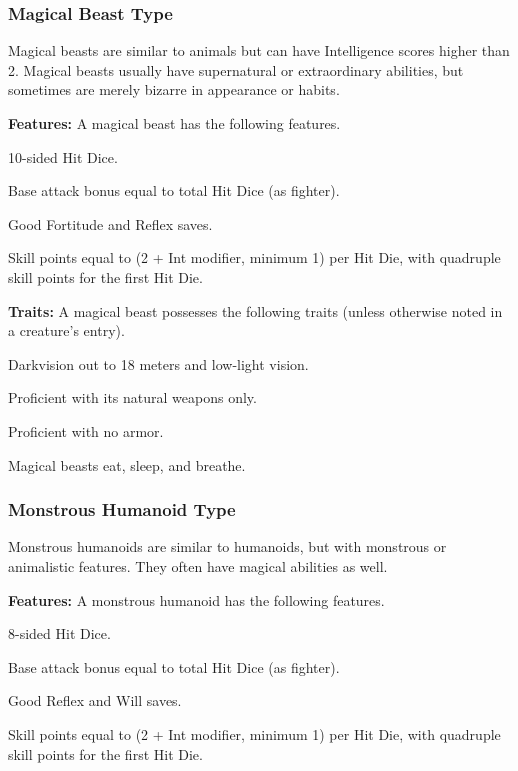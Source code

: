 \subsubsection{Magical Beast Type}
Magical beasts are similar to animals but can have Intelligence scores higher than 2. Magical beasts usually have supernatural or extraordinary abilities, but sometimes are merely bizarre in appearance or habits.

\textbf{Features:} A magical beast has the following features.
\begin{itemize*}
\item 10-sided Hit Dice.
\item Base attack bonus equal to total Hit Dice (as fighter).
\item Good Fortitude and Reflex saves.
\item Skill points equal to (2 + Int modifier, minimum 1) per Hit Die, with quadruple skill points for the first Hit Die.
\end{itemize*}

\textbf{Traits:} A magical beast possesses the following traits (unless otherwise noted in a creature's entry).
\begin{itemize*}
\item Darkvision out to 18 meters and low-light vision.
\item Proficient with its natural weapons only.
\item Proficient with no armor.
\item Magical beasts eat, sleep, and breathe.
\end{itemize*}

\subsubsection{Monstrous Humanoid Type}
Monstrous humanoids are similar to humanoids, but with monstrous or animalistic features. They often have magical abilities as well.

\textbf{Features:} A monstrous humanoid has the following features.
\begin{itemize*}
\item 8-sided Hit Dice.
\item Base attack bonus equal to total Hit Dice (as fighter).
\item Good Reflex and Will saves.
\item Skill points equal to (2 + Int modifier, minimum 1) per Hit Die, with quadruple skill points for the first Hit Die.
\end{itemize*}

